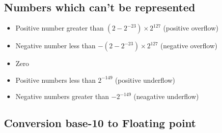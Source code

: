 \documentclass{article}
\begin{document}
\subsection{Numbers which can't be represented}
\begin{itemize}
    \item Positive number greater than $(2-2^{-23}) \times 2^{127}$ (positive overflow)
    \item Negative number less than $-(2-2^{-23}) \times 2^{127}$ (negative overflow)
    \item Zero
    \item Positive numbers less than $2^{-149}$ (positive underflow)
    \item Negative numbers greater than $-2^{-149}$ (neagative underflow)
\end{itemize}

\subsection{Conversion base-10 to Floating point}
\end{document}
